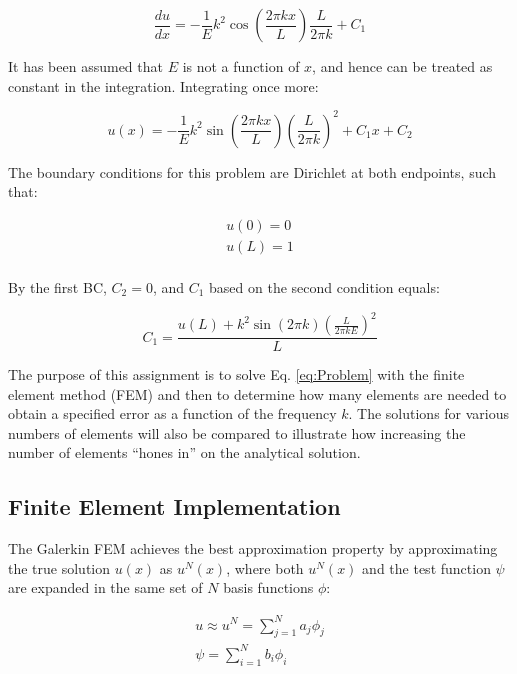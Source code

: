 \documentclass[10pt]{article}
\begin{document}
\begin{equation}
\label{eq:Problem2}
\frac{du}{dx}=-\frac{1}{E}k^2\cos{\left(\frac{2\pi kx}{L}\right)}\frac{L}{2\pi k}+C_1
\end{equation}

It has been assumed that \(E\) is not a function of \(x\), and hence can be treated as constant in the integration. Integrating once more:

\begin{equation}
\label{eq:Problem2}
u(x)=-\frac{1}{E}k^2\sin{\left(\frac{2\pi kx}{L}\right)}\left(\frac{L}{2\pi k}\right)^2+C_1x+C_2
\end{equation}

The boundary conditions for this problem are Dirichlet at both endpoints, such that:

\begin{equation}
\begin{aligned}
u(0)=0\\
u(L)=1\\
\end{aligned}
\end{equation}

By the first BC, \(C_2=0\), and \(C_1\) based on the second condition equals:

\begin{equation}
C_1=\frac{u(L)+k^2\sin{(2\pi k)}\left(\frac{L}{2\pi k E}\right)^2}{L}
\end{equation}

The purpose of this assignment is to solve Eq. \eqref{eq:Problem} with the finite element method (FEM) and then to determine how many elements are needed to obtain a specified error as a function of the frequency \(k\). The solutions for various numbers of elements will also be compared to illustrate how increasing the number of elements ``hones in'' on the analytical solution.

\subsection{Finite Element Implementation}

The Galerkin FEM achieves the best approximation property by approximating the true solution \(u(x)\) as \(u^N(x)\), where both \(u^N(x)\) and the test function \(\psi\) are expanded in the same set of \(N\) basis functions \(\phi\):

\begin{equation}
\label{eq:approx}
\begin{aligned}
u\approx u^N=\sum_{j=1}^{N}a_j\phi_j\\
\psi=\sum_{i=1}^{N}b_i\phi_i\\
\end{aligned}
\end{equation}
\end{document}
